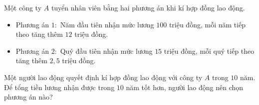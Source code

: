 \begin{bt}%
	Một công ty $A$ tuyển nhân viên bằng hai phương án khi kí hợp đồng lao động.
	\begin{itemize}
		\item Phương án $1\colon $ Năm đầu tiên nhận mức lương $100$ triệu đồng, mỗi năm tiếp theo tăng thêm $12$ triệu đồng.
		\item Phương án $2\colon$ Quý đầu tiên nhận mức lương $15$ triệu đồng, mỗi quý tiếp theo tăng thêm $2{,}5$ triệu đồng.
	\end{itemize}
	Một người lao động quyết định kí hợp đồng lao động với công ty $A$ trong $10$ năm. Để tổng tiền lương nhận được trong $10$ năm tốt hơn, người lao động nên chọn phương án nào?
\end{bt}
